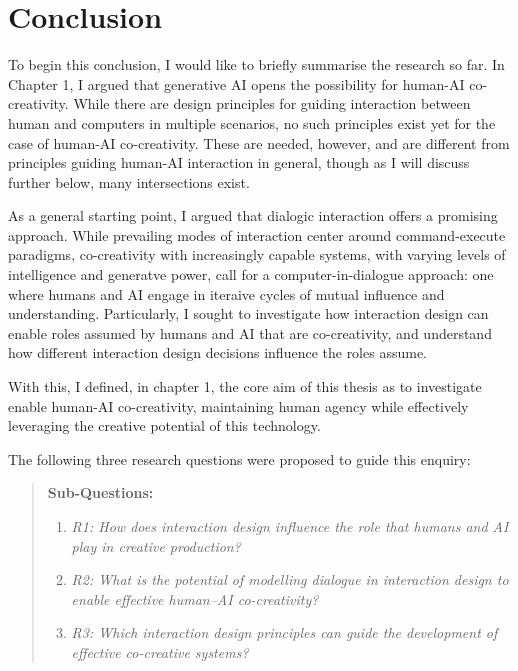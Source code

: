 \chapter[Conclusion]{Conclusion}\label{c:conclusion}

To begin this conclusion, I would like to briefly summarise the research so far. In Chapter 1, I argued that generative AI opens the possibility for human-AI co-creativity. While there are design principles for guiding interaction between human and computers in multiple scenarios, no such principles exist yet for the case of human-AI co-creativity. These are needed, however, and are different from principles guiding human-AI interaction in general, though as I will discuss further below, many intersections exist. 

As a general starting point, I argued that dialogic interaction offers a promising approach. While prevailing modes of interaction center around command-execute paradigms, co-creativity with increasingly capable systems, with varying levels of intelligence and generatve power, call for a computer-in-dialogue approach: one where humans and AI engage in iteraive cycles of mutual influence and understanding. Particularly, I sought to investigate how interaction design can enable roles assumed by humans and AI that are co-creativity, and understand how different interaction design decisions influence the roles assume. 

With this, I defined, in chapter 1, the core aim of this thesis as to investigate enable human-AI co-creativity, maintaining human agency while effectively leveraging the creative potential of this technology.

The following three research questions were proposed to guide this enquiry:

\begin{quote}
\textbf{Sub-Questions:}
\begin{enumerate}
    \item \emph{R1: How does interaction design influence the role that humans and AI play in creative production?}
    \item \emph{R2: What is the potential of modelling dialogue in interaction design to enable effective human–AI co-creativity?}
    \item \emph{R3: Which interaction design principles can guide the development of effective co-creative systems?}
\end{enumerate}
\end{quote}

